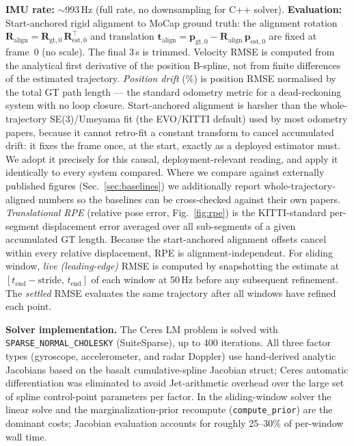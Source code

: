 \documentclass[conference]{IEEEtran}
\begin{document}
\textbf{IMU rate:} $\sim$993\,Hz (full rate, no downsampling for C++ solver).
\textbf{Evaluation:} Start-anchored rigid alignment to MoCap ground
truth: the alignment rotation $\mathbf{R}_\mathrm{align} =
\mathbf{R}_{\mathrm{gt},0}\,\mathbf{R}_{\mathrm{est},0}^\top$
and translation $\mathbf{t}_\mathrm{align} =
\mathbf{p}_{\mathrm{gt},0} - \mathbf{R}_\mathrm{align}\,
\mathbf{p}_{\mathrm{est},0}$ are fixed at frame~0 (no scale).
The final 3\,s is trimmed.  Velocity RMSE is computed from the
analytical first derivative of the position B-spline, not from finite
differences of the estimated trajectory.
\emph{Position drift} (\%) is position RMSE normalised by the total
GT path length --- the standard odometry metric for a
dead-reckoning system with no loop closure.
Start-anchored alignment is harsher than the whole-trajectory
SE(3)/Umeyama fit (the EVO/KITTI default) used by most odometry papers,
because it cannot retro-fit a constant transform to cancel accumulated
drift: it fixes the frame once, at the start, exactly as a deployed
estimator must.  We adopt it precisely for this causal,
deployment-relevant reading, and apply it identically to every system
compared.  Where we compare against externally published figures
(Sec.~\ref{sec:baselines}) we additionally report whole-trajectory-aligned
numbers so the baselines can be cross-checked against their own papers.
\emph{Translational RPE} (relative pose error, Fig.~\ref{fig:rpe}) is
the KITTI-standard per-segment displacement error averaged over all
sub-segments of a given accumulated GT length.
Because the start-anchored alignment offsets cancel within every
relative displacement, RPE is alignment-independent.
For sliding window, \emph{live (leading-edge)} RMSE is computed by
snapshotting the estimate at $[t_\text{end}{-}\text{stride},\, t_\text{end}]$
of each window at 50\,Hz before any subsequent refinement.  The
\emph{settled} RMSE evaluates the same trajectory after all windows
have refined each point.

\textbf{Solver implementation.}
The Ceres LM problem is solved with \texttt{SPARSE\_NORMAL\_CHOLESKY}
(SuiteSparse), up to 400 iterations.
All three factor types (gyroscope, accelerometer, and radar Doppler)
use hand-derived analytic Jacobians based on the basalt
cumulative-spline Jacobian struct; Ceres automatic differentiation was
eliminated to avoid Jet-arithmetic overhead over the large set of
spline control-point parameters per factor.
In the sliding-window solver the linear solve and the
marginalization-prior recompute (\texttt{compute\_prior}) are the
dominant costs; Jacobian evaluation accounts for roughly 25--30\% of
per-window wall time.
\end{document}
